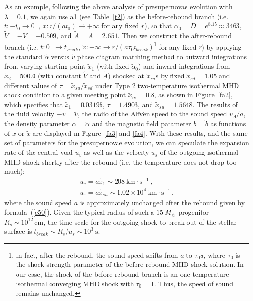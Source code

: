\documentclass[fleqn,usenatbib]{mnras}
\begin{document}
As an example, following the above analysis of presupernovae evolution with $\lambda=0.1$, we again use a1 (see Table~\ref{t2}) as the before-rebound branch (i.e. $t:-t_{0}\rightarrow 0_{-}$, $x:r/\left(at_{0}\right)\rightarrow +\infty$ for any fixed $r$), so that $\alpha_{0}=D=e^{8.15}\approx 3463$, $\widetilde{V}=-V=-0.509$, and $\widetilde{A}=A=2.651$. Then we construct the after-rebound branch (i.e. $t:0_{+}\rightarrow t_{break}$, $\widetilde{x}:+\infty\rightarrow r/\left(a\tau_{0}t_{break}\right)$\footnote{In fact, after the rebound, the sound speed shifts from $a$ to $\tau_{0} a$, where $\tau_{0}$ is the shock strength parameter of the before-rebound MHD shock solution. In our case, the shock of the before-rebound branch is an one-temperature isothermal converging MHD shock with $\tau_{0}=1$. Thus, the speed of sound remains unchanged.} for any fixed $r$) by applying the standard $\widetilde{\alpha}$ versus $\widetilde{v}$ phase diagram matching method to outward integrations from varying starting point $\widetilde{x}_{1}$ (with fixed $\widetilde{\alpha}_{0}$) and inward integrations from $\widetilde{x}_{2}=500.0$ (with constant $\widetilde{V}$ and $\widetilde{A}$) shocked at $\widetilde{x}_{su}$s by fixed $\widetilde{x}_{sd}=1.05$ and different values of $\tau=\widetilde{x}_{su}/\widetilde{x}_{sd}$ under Type 2 two-temperature isothermal MHD shock condition to a given meeting point $\widetilde{x}_{m}=0.8$, as shown in Figure~\ref{fa2}, which specifies that $\widetilde{x}_{1}=0.03195$, $\tau=1.4903$, and $\widetilde{x}_{su}=1.5648$. The results of the fluid velocity $-v=\widetilde{v}$, the radio of the $\text{Alfv}\mathrm{\acute{e}}\text{n}$ speed to the sound speed $v_{A}/a$, the density parameter $\alpha=\widetilde{\alpha}$ and the magnetic field parameter $b=\widetilde{b}$ as functions of $x$ or $\widetilde{x}$ are displayed in Figure~\ref{fa3} and \ref{fa4}. With these results, and the same set of parameters for the presupernovae evolution, we can speculate the expansion rate of the central void $u_{v}$ as well as the velocity $u_{s}$ of the outgoing isothermal MHD shock shortly after the rebound (i.e. the temperature does not drop too much):
\begin{gather}
u_{v}=a\widetilde{x}_{1}\sim 208~\mathrm{km\cdot s^{-1}}\ ,\\
u_{s}=a\widetilde{x}_{su}\sim 1.02\times 10^{4}~\mathrm{km\cdot s^{-1}}\ .
\end{gather}
where the sound speed $a$ is approximately unchanged after the rebound given by formula~(\ref{e50}). Given the typical radius of such a $15~M_{\sun}$ progenitor $R_{s}\sim 10^{12}~\mathrm{cm}$, the time scale for the outgoing shock to break out of the stellar surface is $t_{break}\sim R_{s}/u_{s}\sim 10^{3}~\mathrm{s}$.
\end{document}
